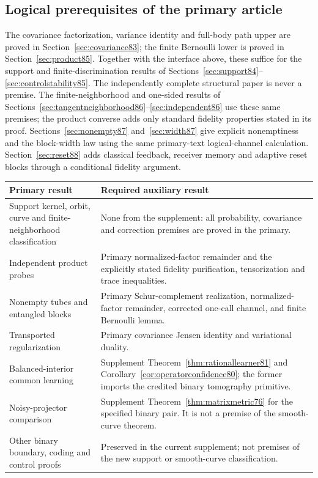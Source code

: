\subsection{Logical prerequisites of the primary article}
The covariance factorization, variance identity and full-body path
upper are proved in Section~\ref{sec:covariance83}; the finite
Bernoulli lower is proved in Section~\ref{sec:product85}.  Together
with the interface above, these suffice for the support and
finite-discrimination results of
Sections~\ref{sec:support84}--\ref{sec:controlstability85}.
The independently complete structural paper is never a premise.
The finite-neighborhood and one-sided results of
Sections~\ref{sec:tangentneighborhood86}--\ref{sec:independent86}
use these same premises; the product converse adds only standard
fidelity properties stated in its proof.  Sections~\ref{sec:nonempty87}
and~\ref{sec:width87} give explicit nonemptiness and the block-width
law using the same primary-text logical-channel calculation.
Section~\ref{sec:reset88} adds classical feedback, receiver memory
and adaptive reset blocks through a conditional fidelity argument.
\begin{center}
\begin{tabular}{@{}>{\raggedright\arraybackslash}p{}>{\raggedright\arraybackslash}p{}@{}}
\toprule
Primary result & Required auxiliary result\\
\midrule
Support kernel, orbit, curve and finite-neighborhood classification &
None from the supplement: all probability, covariance and correction
premises are proved in the primary.\\
Independent product probes &
Primary normalized-factor remainder and the explicitly stated
fidelity purification, tensorization and trace inequalities.\\
Nonempty tubes and entangled blocks &
Primary Schur-complement realization, normalized-factor remainder,
corrected one-call channel, and finite Bernoulli lemma.\\
Transported regularization &
Primary covariance Jensen identity and variational duality.\\
Balanced-interior common learning &
Supplement Theorem~\ref{thm:rationallearner81} and
Corollary~\ref{cor:operatorconfidence80}; the former imports the
credited binary tomography primitive.\\
Noisy-projector comparison &
Supplement Theorem~\ref{thm:matrixmetric76} for the specified binary
pair. It is not a premise of the smooth-curve theorem.\\
Other binary boundary, coding and control proofs &
Preserved in the current supplement; not premises of the new
support or smooth-curve classification.\\
\bottomrule
\end{tabular}
\end{center}

